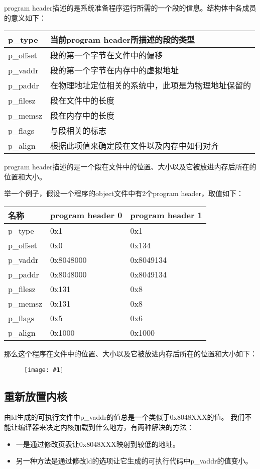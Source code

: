 \documentclass[a4paper,left=2.5cm,right=2.5cm,11pt]{article}
\newcommand{\fic}[1]{\begin{figure}[H]
		\center
		\texttt{[image: \#1]}
	\end{figure}}
\newcommand{\interval}{\vspace{0.5em}}
\begin{document}
	program header描述的是系统准备程序运行所需的一个段的信息。结构体中各成员的意义如下：
	\interval
	\begin{longtable}{p{2cm}p{10cm}}
	\hline
	p\_type & 当前program header所描述的段的类型 \\
	\hline
	p\_offset & 段的第一个字节在文件中的偏移 \\
	\hline
	p\_vaddr & 段的第一个字节在内存中的虚拟地址 \\
	\hline
	p\_paddr & 在物理地址定位相关的系统中，此项是为物理地址保留的 \\
	\hline
	p\_filesz & 段在文件中的长度 \\
	\hline
	p\_memsz & 段在内存中的长度 \\
	\hline
	p\_flags & 与段相关的标志 \\
	\hline
	p\_align & 根据此项值来确定段在文件以及内存中如何对齐 \\
	\hline
	\end{longtable}
	\interval

	program header描述的是一个段在文件中的位置、大小以及它被放进内存后所在的位置和大小。\par
	举一个例子，假设一个程序的object文件中有2个program header，取值如下：
	\interval
	\begin{longtable}{p{2.5cm}|p{3cm}|p{3cm}}
	\hline
	名称 & program header 0 & program header 1 \\
	\hline
	p\_type & 0x1 & 0x1 \\
	\hline
	p\_offset & 0x0 & 0x134 \\
	\hline
	p\_vaddr & 0x8048000 & 0x8049134 \\
	\hline
	p\_paddr & 0x8048000 & 0x8049134 \\
	\hline
	p\_filesz & 0x131 & 0x8 \\
	\hline
	p\_memsz & 0x131 & 0x8 \\
	\hline
	p\_flags & 0x5 & 0x6 \\
	\hline
	p\_align & 0x1000 & 0x1000 \\
	\hline
	\end{longtable}
	\interval

	那么这个程序在文件中的位置、大小以及它被放进内存后所在的位置和大小如下：
	\fic{1.png}

\subsection{重新放置内核}
	由ld生成的可执行文件中p\_vaddr的值总是一个类似于0x8048XXX的值。
	我们不能让编译器来决定内核加载到什么地方，有两种解决的方法：
	\begin{itemize}
		\item 一是通过修改页表让0x8048XXX映射到较低的地址。
		\item 另一种方法是通过修改ld的选项让它生成的可执行代码中p\_vaddr的值变小。
	\end{itemize}
\end{document}
